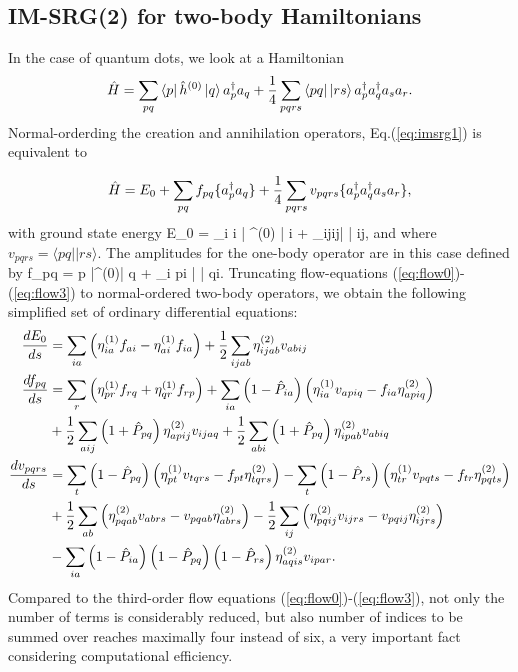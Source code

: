 \subsection{IM-SRG(2) for two-body Hamiltonians}
\label{sub:imsrg2}

In the case of quantum dots, we look at a Hamiltonian
\begin{equation}
\hat{H} = \sum\limits_{pq}\left\langle p \right| \hat{h}^{(0)} \left| q \right\rangle a_p\da a_q + \frac{1}{4}\sum\limits_{pqrs}\lla pq \right|\left| r s \rra a_p\da a_q\da a_s a_r.
\label{eq:imsrg1}
\end{equation} 
Normal-orderding the creation and annihilation operators, Eq.(\ref{eq:imsrg1}) is equivalent to

\begin{equation}
\hat{H} = E_0 + 
 \sum\limits_{pq}f_{pq}\lbrace a_p^\dagger a_q\rbrace + \frac{1}{4}\sum\limits_{pqrs}v_{pqrs} \lbrace a_p^\dagger a_q^\dagger a_s a_r \rbrace ,
\end{equation}
with ground state energy
\be
E_0 = \sum\limits_i \lla i \right| ^{(0)} \left| i \rra + \sum\limits_{ij}\lla ij\right|  \left| ij\rra,
\label{eq:gs2}
\ee
and where $v_{pqrs} = \langle pq||rs\rangle$.
The amplitudes for the one-body operator are in this case defined by
\be
f_{pq} = \lla p \right|^{(0)}\left| q \rra + \sum\limits_i \lla pi \right| \left| qi\rra.
\label{eq:felems}
\ee
Truncating flow-equations (\ref{eq:flow0})-(\ref{eq:flow3}) to normal-ordered two-body operators, we obtain the following simplified set of ordinary differential equations:
\begin{align}
\frac{d E_0}{ds} &=  \sum_{ia}\left( \eta_{ia}^{(1)}f_{ai} - \eta_{ai}^{(1)}f_{ia}\right) + \frac{1}{2}\sum_{ijab}\eta_{ijab}^{(2)}v_{abij} 
\label{eq:flow2order1}\\
\frac{d f_{pq}}{ds}&= \sum_r \lb \eta_{pr}^{(1)}f_{rq} + \eta_{qr}^{(1)}f_{rp}\right) 
+ \sum_{ia}\lb 1-\hat{P}_{ia}\rb \lb \eta_{ia}^{(1)}v_{apiq} - f_{ia}\eta_{apiq}^{(2)} \rb \notag \\
& +\frac{1}{2} \sum_{aij} \lb 1+\hat{P}_{pq}\rb \eta_{apij}^{(2)}v_{ijaq} + \frac{1}{2}\sum_{abi}\lb 1+\hat{P}_{pq}\rb \eta_{ipab}^{(2)}v_{abiq}
\label{eq:flow2order2}\\
\frac{d v_{pqrs}}{ds} &= \sum_t \lb 1-\hat{P}_{pq} \rb \lb \eta_{pt}^{(1)}v_{tqrs}-f_{pt}\eta_{tqrs}^{(2)}\rb 
-\sum_t \lb 1-\hat{P}_{rs} \rb \lb \eta_{tr}^{(1)} v_{pqts} - f_{tr} \eta_{pqts}^{(2)}\rb \notag \\
& +\frac{1}{2}\sum_{ab} \lb\eta_{pqab}^{(2)} v_{abrs} - v_{pqab}\eta_{abrs}^{(2)}\rb - 
\frac{1}{2}\sum_{ij} \lb\eta_{pqij}^{(2)} v_{ijrs} - v_{pqij}\eta_{ijrs}^{(2)}\rb \notag \\
& -\sum_{ia} \lb 1- \hat{P}_{ia} \rb \lb 1-\hat{P}_{pq}\rb \lb 1-\hat{P}_{rs} \rb \eta_{aqis}^{(2)}v_{ipar}.
\label{eq:flow2order}
\end{align}
Compared to the third-order flow equations (\ref{eq:flow0})-(\ref{eq:flow3}), not only the number of terms is considerably reduced, but also number of indices to be summed over reaches maximally four instead of six, a very important fact considering computational efficiency.

